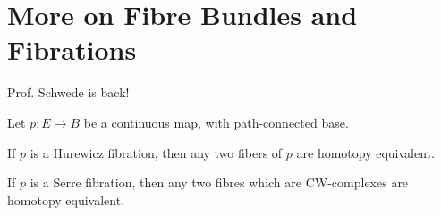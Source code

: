 
\section{More on Fibre Bundles and Fibrations}


Prof. Schwede is back!

\begin{theorem}
Let $p:E\to B$ be a continuous map, with path-connected base.
\begin{numerate}
    \item If $p$ is a Hurewicz fibration, then any two fibers of $p$ are homotopy equivalent.
    \item If $p$ is a Serre fibration, then any two fibres which are CW-complexes are homotopy equivalent.
\end{numerate}
\end{theorem}

